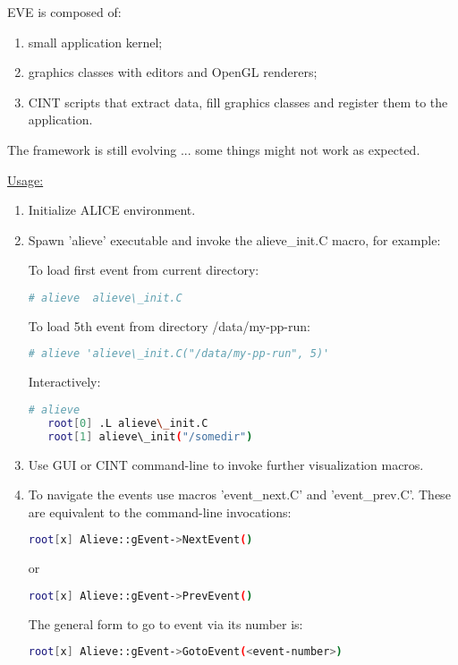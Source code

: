 \documentclass[12pt,a4paper,twoside]{article}
\begin{document}
{EVE is composed of:
\begin{enumerate}
\item small application kernel;
\item graphics classes with editors and OpenGL renderers;
\item CINT scripts that extract data, fill graphics classes and register
   them to the application.
\end{enumerate}

The framework is still evolving ... some things might not work as expected.

\underline{Usage:}

\begin{enumerate}
\item Initialize ALICE environment.
\item Spawn 'alieve' executable and invoke the alieve\_init.C macro,
  for example:

To load first event from current directory:
\begin{lstlisting}[language=sh]
   # alieve  alieve\_init.C 
\end{lstlisting}
To load 5th event from directory /data/my-pp-run:
\begin{lstlisting}[language=sh]
   # alieve 'alieve\_init.C("/data/my-pp-run", 5)' 
\end{lstlisting}
Interactively:
\begin{lstlisting}[language=sh]
   # alieve
   root[0] .L alieve\_init.C
   root[1] alieve\_init("/somedir")
\end{lstlisting}

\item Use GUI or CINT command-line to invoke further visualization macros.
\item To navigate the events use macros 'event\_next.C' and 'event\_prev.C'.
   These are equivalent to the command-line invocations:
\begin{lstlisting}[language=sh]
   root[x] Alieve::gEvent->NextEvent()
\end{lstlisting}
or
\begin{lstlisting}[language=sh]
   root[x] Alieve::gEvent->PrevEvent()
\end{lstlisting}
The general form to go to event via its number is:
\begin{lstlisting}[language=sh]
   root[x] Alieve::gEvent->GotoEvent(<event-number>)
\end{lstlisting}
\end{enumerate}

}
\end{document}
